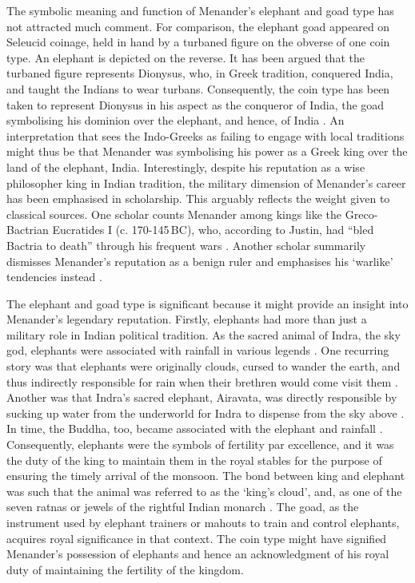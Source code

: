 \documentclass{ijsra}
\renewcommand\BC{{\,BC\xspace}}
\begin{document}
The symbolic meaning and function of Menander’s elephant and goad type has not attracted much comment. 
For comparison, the elephant goad appeared on Seleucid coinage, held in hand by a turbaned figure on the obverse of one coin type.
An elephant is depicted on the reverse. 
It has been argued that the turbaned figure represents Dionysus, who, in Greek tradition, conquered India,
and taught the Indians to wear turbans.
Consequently, the coin type has been taken to represent Dionysus in his aspect as the conqueror of India,
the goad symbolising his dominion over the elephant, and hence, of India \parencite[147--164]{Iossif2010}.
An interpretation that sees the Indo-Greeks as failing to engage with local traditions might thus be that Menander was
symbolising his power as a Greek king over the land of the elephant, India.
Interestingly, despite his reputation as a wise philosopher king in Indian tradition, the military dimension of Menander’s
career has been emphasised in scholarship. 
This arguably reflects the weight given to classical sources.
One scholar counts Menander among kings like the Greco-Bactrian Eucratides I (c. 170-145\BC), who, according to Justin,
had “bled Bactria to death” through his frequent wars \parencite[128]{Holt2005}. 
Another scholar summarily dismisses Menander’s reputation as a benign ruler and emphasises his ‘warlike’ tendencies instead \parencite[15--16]{Widemann2007}.

The elephant and goad type is significant because it might provide an insight into Menander’s legendary reputation.
Firstly, elephants had more than just a military role in Indian political tradition.
As the sacred animal of Indra, the sky god, elephants were associated with rainfall in various legends \parencites[19]{Gupta1983}[37--43]{Srivastava1989}.%
One recurring story was that elephants were originally clouds, cursed to wander the earth, 
and thus indirectly responsible for rain when their brethren would come visit them \parencite[38--39]{Gonda1966}. 
Another was that Indra’s sacred elephant, Airavata, was directly responsible by sucking up water from the underworld for
Indra to dispense from the sky above \parencite[23--24]{Gupta1983}. 
In time, the Buddha, too, became associated with the elephant and rainfall \parencite[23--24]{Gupta1983}. 
Consequently, elephants were the symbols of fertility par excellence, and it was the duty of the king to maintain them in
the royal stables for the purpose of ensuring the timely arrival of the monsoon. 
The bond between king and elephant was such that the animal was referred to as the ‘king’s cloud’, and,
as one of the seven ratnas or jewels of the rightful Indian monarch \parencites[38--39]{Gonda1966}[107]{Zimmer2015}.
The goad, as the instrument used by elephant trainers or mahouts to train and control elephants,
acquires royal significance in that context.
The coin type might have signified Menander’s possession of elephants and hence an acknowledgment of his royal duty of maintaining
the fertility of the kingdom.
\end{document}
